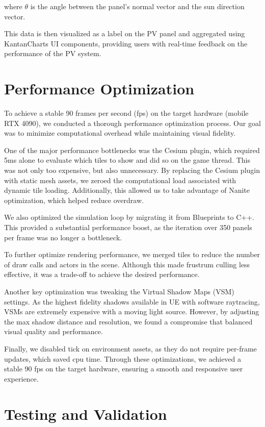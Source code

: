 \documentclass[draft, final]{vutinfth} %
\begin{document}
where $\theta$ is the angle between the panel's normal vector and the sun direction vector.

This data is then visualized as a label on the PV panel and aggregated using KantanCharts UI components, providing users with real-time feedback on the performance of the PV system.

\section{Performance Optimization}

To achieve a stable 90 frames per second (fps) on the target hardware (mobile RTX 4090), we conducted a thorough performance optimization process. Our goal was to minimize computational overhead while maintaining visual fidelity.

One of the major performance bottlenecks was the Cesium plugin, which required 5ms alone to evaluate which tiles to show and did so on the game thread. This was not only too expensive, but also unnecessary. By replacing the Cesium plugin with static mesh assets, we zeroed the computational load associated with dynamic tile loading. Additionally, this allowed us to take advantage of Nanite optimization, which helped reduce overdraw.

We also optimized the simulation loop by migrating it from Blueprints to C++. This provided a substantial performance boost, as the iteration over 350 panels per frame was no longer a bottleneck.

To further optimize rendering performance, we merged tiles to reduce the number of draw calls and actors in the scene. Although this made frustrum culling less effective, it was a trade-off to achieve the desired performance.

Another key optimization was tweaking the Virtual Shadow Maps (VSM) settings. As the highest fidelity shadows available in UE with software raytracing, VSMs are extremely expensive with a moving light source. However, by adjusting the max shadow distance and resolution, we found a compromise that balanced visual quality and performance.

Finally, we disabled tick on environment assets, as they do not require per-frame updates, which saved cpu time. Through these optimizations, we achieved a stable 90 fps on the target hardware, ensuring a smooth and responsive user experience.

\section{Testing and Validation}
\end{document}
